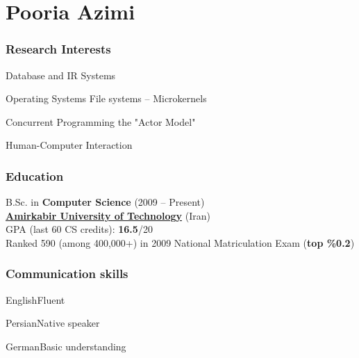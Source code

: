 \documentclass{tccv}
\begin{document}
\thispagestyle{empty}
\part{Pooria Azimi}




\section{Research Interests}


\begin{research_interest}

\item{Database and IR Systems}
     {}

\item{Operating Systems}
     {File systems -- Microkernels}

\item{Concurrent Programming}
     {the "Actor Model"}

\item{Human-Computer Interaction}
     {}

\end{research_interest}








\section{Education}

B.Sc. in {\bf Computer Science} (2009 -- Present)
\\[1.5pt]
{\bf \href{https://en.wikipedia.org/wiki/Amirkabir_University_of_Technology}{Amirkabir University of Technology}} (Iran)
\\[1.7pt]
GPA (last 60 CS credits): {\bf 16.5}/20
\bigskip\\
Ranked 590 (among 400,000+) in 2009 National Matriculation Exam ({\bf top \%0.2})








\section{Communication skills}


\begin{factlist}

\item{English}{Fluent}

\item{Persian}{Native speaker}

\item{German}{Basic understanding}

\end{factlist}
\end{document}
